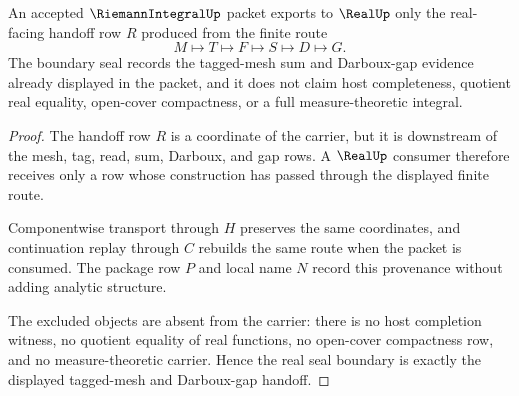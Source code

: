 \begin{theorem}
\label{thm:riemann-integral-real-seal-boundary}
An accepted $\RiemannIntegralUp$ packet exports to $\RealUp$ only the real-facing handoff row $R$ produced from the finite route
$$
M\longmapsto T\longmapsto F\longmapsto S\longmapsto D\longmapsto G .
$$
The boundary seal records the tagged-mesh sum and Darboux-gap evidence already displayed in the packet, and it does not claim host completeness, quotient real equality, open-cover compactness, or a full measure-theoretic integral.
\end{theorem}
\begin{proof}
The handoff row $R$ is a coordinate of the carrier, but it is downstream of the mesh, tag, read, sum, Darboux, and gap rows. A $\RealUp$ consumer therefore receives only a row whose construction has passed through the displayed finite route.

Componentwise transport through $H$ preserves the same coordinates, and continuation replay through $C$ rebuilds the same route when the packet is consumed. The package row $P$ and local name $N$ record this provenance without adding analytic structure.

The excluded objects are absent from the carrier: there is no host completion witness, no quotient equality of real functions, no open-cover compactness row, and no measure-theoretic carrier. Hence the real seal boundary is exactly the displayed tagged-mesh and Darboux-gap handoff.
\end{proof}

